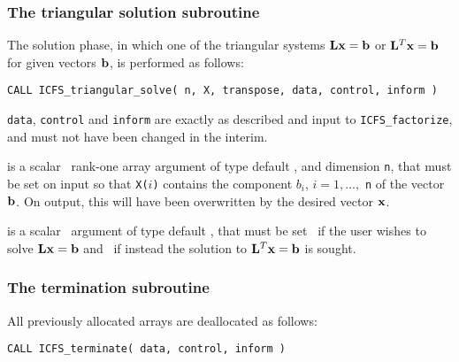 \documentclass{galahad}
\newcommand{\packagename}{ICFS}
\begin{document}

\subsubsection{The triangular solution subroutine}

The solution phase, in which one of the triangular systems
${\mathbf{L}} {\mathbf{x}} = {\mathbf{b}}$ or ${\mathbf{L}}^T {\mathbf{x}} = {\mathbf{b}}$ for given vectors ${\mathbf{b}}$,
is performed as follows:
\vspace*{1mm}

\hspace{8mm}
{\tt CALL \packagename\_triangular\_solve( n, X, transpose, data, control, inform )}
\vspace*{-1mm}

\begin{description}
 {\tt data}, {\tt control} and {\tt inform} are
exactly as described and input to {\tt \packagename\_factorize},
and must not have been changed in the interim.

 is a scalar \intentinout\ rank-one array argument of type
default \realdp, and dimension {\tt n}, that  must be set on input so that
{\tt X(}$i${\tt)} contains the component $b_i$, $i = 1, \ldots,$ {\tt n}
of the vector ${\mathbf{b}}$. On output, this will have been overwritten by the
desired vector ${\mathbf{x}}$.

 is a scalar \intentin\ argument of type
default \logical, that must be set \false\ if the user wishes to solve
${\mathbf{L}} {\mathbf{x}} = {\mathbf{b}}$ and \true\ if instead the solution to ${\mathbf{L}}^T {\mathbf{x}} = {\mathbf{b}}$
is sought.

\end{description}


\subsubsection{The  termination subroutine}
All previously allocated arrays are deallocated as follows:
\vspace*{1mm}

\hspace{8mm}
{\tt CALL \packagename\_terminate( data, control, inform )}
\end{document}
